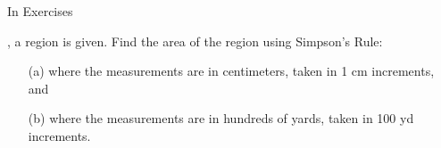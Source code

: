 {\noindent In Exercises}
{, a region is given. Find the area of the region using Simpson's Rule:
\begin{enumerate}
\item	[(a)] where the measurements are in centimeters, taken in 1 cm increments, and
\item	[(b)] where the measurements are in hundreds of yards, taken in 100 yd increments.
\end{enumerate}
}
